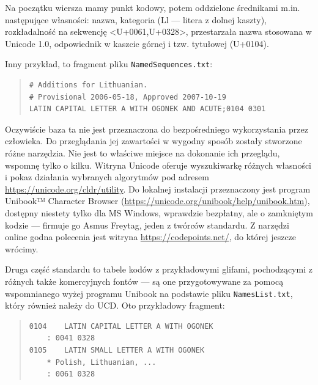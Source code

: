 Na początku wiersza mamy punkt kodowy, potem oddzielone średnikami
m.in. następujące własności: nazwa, kategoria (Ll --- litera z dolnej
kaszty), rozkładalność na sekwencję <U+0061,U+0328>, przestarzała
nazwa stosowana w Unicode 1.0, odpowiednik w kaszcie górnej i
tzw. tytułowej (U+0104).



Inny przykład, to fragment pliku \texttt{NamedSequences.txt}:
\begin{quote}
\begin{verbatim}
# Additions for Lithuanian.
# Provisional 2006-05-18, Approved 2007-10-19
LATIN CAPITAL LETTER A WITH OGONEK AND ACUTE;0104 0301
\end{verbatim}
\end{quote}
Oczywiście baza ta nie jest przeznaczona do bezpośredniego
wykorzystania przez człowieka. Do przeglądania jej zawartości w
wygodny sposób zostały stworzone różne narzędzia.  Nie jest to
właściwe miejsce na dokonanie ich przeglądu, wspomnę tylko o
kilku. Witryna Unicode oferuje wyszukiwarkę różnych własności i pokaz
działania wybranych algorytmów pod adresem
\url{https://unicode.org/cldr/utility}.  Do lokalnej instalacji
przeznaczony jest program \textsf{Unibook™ Character Browser}
(\url{https://unicode.org/unibook/help/unibook.htm}), dostępny
niestety tylko dla MS Windows, wprawdzie bezpłatny, ale o zamkniętym
kodzie --- firmuje go Asmus Freytag, jeden z twórców standardu. Z
narzędzi online godna polecenia jest witryna
\url{https://codepoints.net/}, do której jeszcze wrócimy.

Druga część standardu to tabele kodów z przykładowymi glifami,
pochodzącymi z różnych także komercyjnych fontów --- są one
przygotowywane za pomocą wspomnianego wyżej programu \textsf{Unibook}
na podstawie pliku \texttt{NamesList.txt}, który również należy do
UCD. Oto przykładowy fragment:

\begin{quote}
\begin{verbatim}
0104	LATIN CAPITAL LETTER A WITH OGONEK
	: 0041 0328
0105	LATIN SMALL LETTER A WITH OGONEK
	* Polish, Lithuanian, ...
	: 0061 0328
\end{verbatim}
\end{quote}

